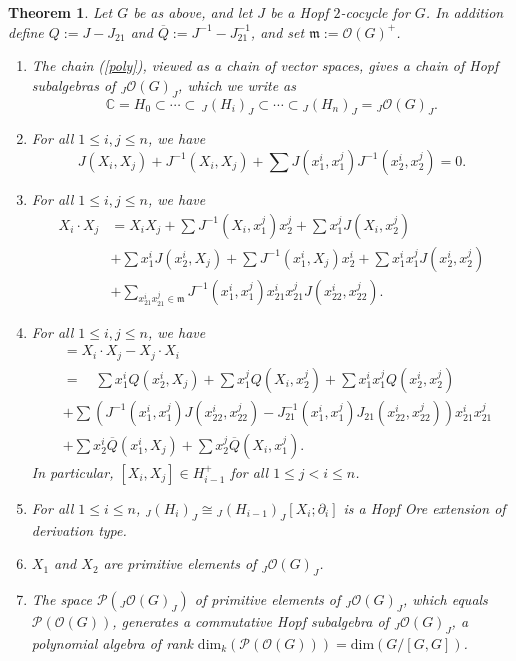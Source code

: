 \documentclass{amsart}
\numberwithin{equation}{section}
\newtheorem{theorem}{Theorem}[section]
\theoremstyle{definition}
\begin{document}
\begin{theorem}\label{Ore} Let $G$ be as above, and let $J$ be a Hopf $2$-cocycle for $G$. In addition define $Q := J - J_{21}$ and $\overline{Q} := J^{-1} - J^{-1}_{21}$, and set $\mathfrak{m}:=\mathcal{O}(G)^+$.
\begin{enumerate}
\item The chain (\ref{poly}), viewed as a chain of vector spaces, gives a chain of Hopf subalgebras of ${}_J\mathcal{O}(G)_J$, which we write as
\begin{equation}\label{poly2} \mathbb{C} = H_0 \subset \cdots \subset \, _J(H_i)_J \subset \cdots \subset {}_J(H_n)_J ={}_J\mathcal{O}(G)_J.
\end{equation}
\item 
For all $1 \leq i,j \leq n$, we have
$$ J(X_i,X_j) + J^{-1}(X_i,X_j) + \sum J(x^i_1,x^j_1)J^{-1}(x^i_2, x^j_2) =0.$$
\item 
For all $1 \leq i,j \leq n$, we have
\begin{align*}X_i \cdot X_j &= X_iX_j + \sum J^{-1}(X_i, x^j_1)x^j_2 + \sum x^j_1J(X_i, x^j_2)\\
& +\sum x^i_1 J(x^i_2, X_j) + \sum J^{-1}(x^i_1,X_j)x^i_2 + \sum x^i_1 x^j_1J(x^i_2,x^j_2)\\
&+ \sum_{x^i_{21}x^j_{21} \in \mathfrak{m}} J^{-1}(x^i_1,x^j_1)x^i_{21}x^j_{21}J(x^i_{22},x^j_{22}).
\end{align*}
\item 
For all $1 \leq i,j \leq n$, we have 
\begin{align*}  [X_i,X_j] &= X_i\cdot X_j - X_j \cdot X_i\\
&= \quad \sum x^i_1 Q(x^i_2, X_j) + \sum x^j_1 Q(X_i, x^j_2) + \sum x^i_1 x^j_1 Q(x^i_2,x^j_2)\\
&  + \sum \left( J^{-1}(x^i_1,x^j_1)J(x^i_{22},x^j_{22}) - J_{21}^{-1}(x^i_1,x^j_1)J_{21}(x^i_{22},x^j_{22})\right)x^i_{21}x^j_{21}\\
& + \sum x^i_2\overline{Q}(x^i_1,X_j) + \sum x^j_2 \overline{Q}(X_i, x^j_1).
\end{align*}
\noindent In particular, $[X_i,X_j] \in H_{i-1}^+$ for all $1 \leq j<i \leq n$.
\item 
For all $1 \leq i \leq n$, ${}_J(H_i)_J \cong  
{}_J(H_{i-1})_J[X_i; \partial_i]$ is a Hopf Ore extension of derivation type.
\item 
$X_1$ and $X_2$ are primitive elements of ${}_J\mathcal{O}(G)_J$. 
\item 
The space $\mathcal{P}({}_J\mathcal{O}(G)_J)$ of primitive elements of $_J\mathcal{O}(G)_J$, which equals $\mathcal{P}(\mathcal{O}(G))$, generates a commutative Hopf subalgebra of $_J\mathcal{O}(G)_J$, a polynomial algebra of rank $\mathrm{dim}_k(\mathcal{P}(\mathcal{O}(G)))= \mathrm{dim}(G/[G,G])$.
\end{enumerate}
\end{theorem}
\end{document}
